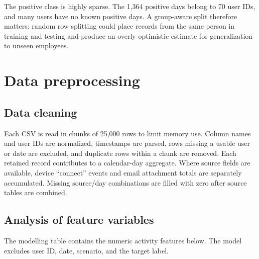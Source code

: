 \documentclass[12pt,a4paper,oneside]{report}
\begin{document}
The positive class is highly sparse. The 1,364 positive days belong to
70 user IDs, and many users have no known positive days. A group-aware
split therefore matters: random row splitting could place records from
the same person in training and testing and produce an overly optimistic
estimate for generalization to unseen employees.

\section{Data preprocessing}
\subsection{Data cleaning}
Each CSV is read in chunks of 25,000 rows to limit memory use. Column
names and user IDs are normalized, timestamps are parsed, rows missing a
usable user or date are excluded, and duplicate rows within a chunk are
removed. Each retained record contributes to a calendar-day aggregate.
Where source fields are available, device ``connect'' events and email
attachment totals are separately accumulated. Missing source/day
combinations are filled with zero after source tables are combined.

\subsection{Analysis of feature variables}
The modelling table contains the numeric activity features below. The
model excludes user ID, date, scenario, and the target label.
\end{document}
